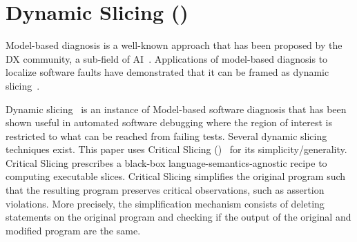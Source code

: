 \documentclass{article}
\begin{document}

\section{Dynamic Slicing (\ds{})}
\label{sec:slicing}


Model-based diagnosis is a well-known approach that has been proposed by the
DX community, a sub-field of AI~\cite{REITER198757,DEKLEER200325}. Applications
of model-based diagnosis to localize software faults have demonstrated that it
can be framed as dynamic slicing~\cite{Mayer:2008:EMM:1642931.1642950,mayer2008prioritising}.

Dynamic slicing~\cite{Agrawal:1990:DPS:93542.93576}
is an instance of Model-based software diagnosis that
has been shown useful in automated software debugging where the region
of interest is restricted to what can be reached from failing
tests. Several dynamic slicing techniques exist. This paper uses
Critical Slicing (\cs{})~\cite{DeMillo:1996:CSS:229000.226310} for its
simplicity/generality. Critical Slicing
prescribes a black-box language-semantics-agnostic recipe to computing
executable slices. Critical Slicing simplifies the original
program such that the resulting program preserves critical
observations, such as assertion violations. More precisely, the
simplification mechanism consists of deleting statements on the
original program and checking if the output of the original and
modified program are the same.
\end{document}
